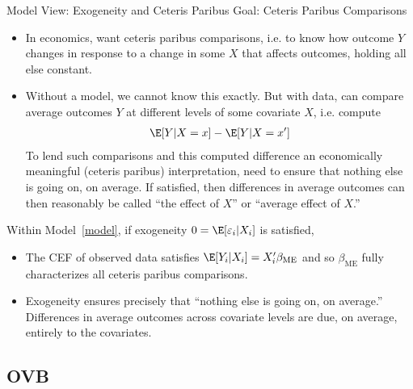 \documentclass[aspectratio=169, handout]{beamer}
\begin{document}
{\scriptsize
\begin{frame}{Model View: Exogeneity and Ceteris Paribus}
  \alert{Goal}: Ceteris Paribus Comparisons
\begin{itemize}
  \item In economics, want \alert{ceteris paribus}
    comparisons, i.e. to know how outcome $Y$ changes in response to a
    change in some $X$ that affects outcomes, holding all else constant.
  \item Without a model, we cannot know this exactly.
    But with data, can compare \alert{average} outcomes $Y$ at
    different levels of some covariate $X$, i.e. compute
    \begin{align*}
      \E[Y|X=x] - \E[Y|X=x']
    \end{align*}
    To lend such comparisons and this computed difference an
    \alert{economically meaningful} (\alert{ceteris paribus})
    interpretation, need to ensure that \alert{nothing} else is going
    on, on average.
    If satisfied, then differences in average outcomes can then
    reasonably be called ``the effect of $X$'' or ``average effect of
    $X$.''
\end{itemize}
Within Model~\ref{model},
if exogeneity $0=\E[\varepsilon_i|X_i]$ is satisfied,
\begin{itemize}
  \item
    The CEF of observed data satisfies
    $\E[Y_i|X_i]=X_i'\beta_{\text{ME}}$ and so $\beta_{\text{ME}}$
    fully characterizes all ceteris paribus comparisons.

  \item
    Exogeneity ensures precisely that
    ``nothing else is going on, on average.''
    Differences in average outcomes across covariate levels are due, on
    average, entirely to the covariates.
\end{itemize}
\end{frame}
}



\subsection{OVB}
\end{document}
